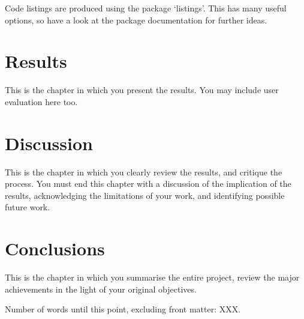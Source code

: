 \documentclass[12pt,a4paper]{report}
\begin{document}
Code listings are produced using the package `listings'.  This has many useful options, so have a look at the package documentation for further ideas.

\chapter{Results}

This is the chapter in which you present the results. You may include user evaluation here too.

\chapter{Discussion}

This is the chapter in which you clearly review the results, and critique the process. You must end this chapter with a discussion of the implication of the results, acknowledging the limitations of your work, and identifying possible future work.  

\chapter{Conclusions}


This is the chapter in which you summarise the entire project, review the major achievements in the light of your original objectives.

\vfill
Number of words until this point, excluding front matter: XXX.



\appendix
\end{document}
